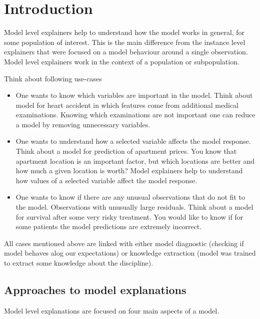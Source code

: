 \documentclass[]{krantz}
\providecommand{\tightlist}{%
  \setlength{\itemsep}{0pt}\setlength{\parskip}{0pt}}
\theoremstyle{definition}
\theoremstyle{definition}
\theoremstyle{definition}
\theoremstyle{remark}
\begin{document}
\hypertarget{introduction-3}{%
\section{Introduction}\label{introduction-3}}

Model level explainers help to understand how the model works in
general, for some population of interest. This is the main difference
from the instance level explainers that were focused on a model
behaviour around a single observation. Model level explainers work in
the context of a population or subpopulation.

Think about following use-cases

\begin{itemize}
\tightlist
\item
  One wants to know which variables are important in the model. Think
  about model for heart accident in which features come from additional
  medical examinations. Knowing which examinations are not important one
  can reduce a model by removing unnecessary variables.
\item
  One wants to understand how a selected variable affects the model
  response. Think about a model for prediction of apartment prices. You
  know that apartment location is an important factor, but which
  locations are better and how much a given location is worth? Model
  explainers help to understand how values of a selected variable affect
  the model response.
\item
  One wants to know if there are any unusual observations that do not
  fit to the model. Observations with unusually large residuals. Think
  about a model for survival after some very risky treatment. You would
  like to know if for some patients the model predictions are extremely
  incorrect.
\end{itemize}

All cases mentioned above are linked with either model diagnostic
(checking if model behaves alog our expectations) or knowledge
extraction (model was trained to extract some knowledge about the
discipline).

\hypertarget{approaches-to-model-explanations}{%
\subsection{Approaches to model
explanations}\label{approaches-to-model-explanations}}

Model level explanations are focused on four main aspects of a model.
\end{document}
